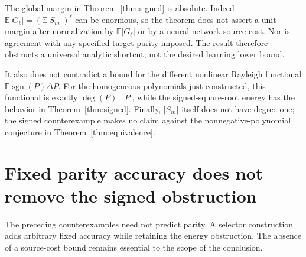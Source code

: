 \documentclass[10pt]{article}
\newcommand{\E}{\mathbb E}
\newcommand{\sgn}{\operatorname{sgn}}
\begin{document}
The global margin in Theorem~\ref{thm:signed} is absolute.
Indeed $\E|G_\ell|=(\E|S_m|)^\ell$ can be enormous, so the theorem
does not assert a unit margin after normalization by $\E|G_\ell|$
or by a neural-network source cost. Nor is agreement with any specified
target parity imposed. The result therefore obstructs a universal
analytic shortcut, not the desired learning lower bound.

It also does not contradict a bound for the different nonlinear
Rayleigh functional $\E\sgn(P)\Delta P$. For the homogeneous
polynomials just constructed, this functional is exactly
$\deg(P)\E|P|$, while the signed-square-root energy has the behavior
in Theorem~\ref{thm:signed}. Finally, $|S_m|$ itself does not have
degree one; the signed counterexample makes no claim against the
nonnegative-polynomial conjecture in Theorem~\ref{thm:equivalence}.

\section{Fixed parity accuracy does not remove the signed obstruction}
The preceding counterexamples need not predict parity. A selector
construction adds arbitrary fixed accuracy while retaining the energy
obstruction. The absence of a source-cost bound remains essential to
the scope of the conclusion.
\end{document}
